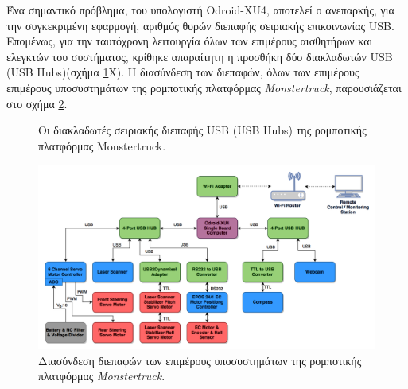 \bigskip
Ένα σημαντικό πρόβλημα, του υπολογιστή {Odroid-XU4}, αποτελεί ο ανεπαρκής, για την συγκεκριμένη εφαρμογή, αριθμός θυρών διεπαφής σειριακής επικοινωνίας USB. Επομένως, για την ταυτόχρονη λειτουργία όλων των επιμέρους αισθητήρων και ελεγκτών του συστήματος, κρίθηκε απαραίτητη η προσθήκη δύο {διακλαδωτών USB (USB Hubs)}(σχήμα \ref{fig:usb_hubs}X). Η διασύνδεση των διεπαφών, όλων των επιμέρους επιμέρους υποσυστημάτων της ρομποτικής πλατφόρμας \textit{Monstertruck}, παρουσιάζεται στο σχήμα \ref{fig:hardware_interface_diagram}.

\begin{figure}[!ht]
	\centering
	\caption{Οι διακλαδωτές σειριακής διεπαφής USB (USB Hubs) της ρομποτικής  πλατφόρμας Monstertruck.}
	\label{fig:usb_hubs}
\end{figure}


\begin{figure}[!ht]
	\centering
	\includegraphics[width=1\linewidth]{Chapters/Chapter2/Figures/hardware_interface_diagram.png}
	\caption{Διασύνδεση διεπαφών των επιμέρους υποσυστημάτων της ρομποτικής πλατφόρμας \textit{Monstertruck}.}
	\label{fig:hardware_interface_diagram}
\end{figure}



